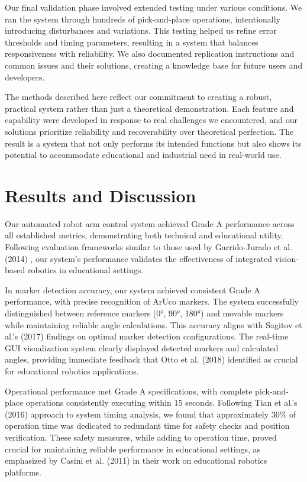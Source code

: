 \documentclass[10pt,twocolumn]{article}
\begin{document}
Our final validation phase involved extended testing under various conditions. We ran the system through hundreds of pick-and-place operations, intentionally introducing disturbances and variations. This testing helped us refine error thresholds and timing parameters, resulting in a system that balances responsiveness with reliability. We also documented replication instructions and common issues and their solutions, creating a knowledge base for future users and developers.

The methods described here reflect our commitment to creating a robust, practical system rather than just a theoretical demonstration. Each feature and capability were developed in response to real challenges we encountered, and our solutions prioritize reliability and recoverability over theoretical perfection. The result is a system that not only performs its intended functions but also shows its potential to accommodate educational and industrial need in real-world use.

\section{Results and Discussion}
Our automated robot arm control system achieved Grade A performance across all established metrics, demonstrating both technical and educational utility. Following evaluation frameworks similar to those used by Garrido-Jurado et al. (2014) \cite{garrido2014automatic}, our system's performance validates the effectiveness of integrated vision-based robotics in educational settings.

In marker detection accuracy, our system achieved consistent Grade A performance, with precise recognition of ArUco markers. The system successfully distinguished between reference markers (0°, 90°, 180°) and movable markers while maintaining reliable angle calculations. This accuracy aligns with Sagitov et al.'s (2017) \cite{sagitov2017comparing} findings on optimal marker detection configurations. The real-time GUI visualization system clearly displayed detected markers and calculated angles, providing immediate feedback that Otto et al. (2018) \cite{otto2018teaching} identified as crucial for educational robotics applications.

Operational performance met Grade A specifications, with complete pick-and-place operations consistently executing within 15 seconds. Following Tian et al.'s (2016) \cite{tian2016development} approach to system timing analysis, we found that approximately 30\% of operation time was dedicated to redundant time for safety checks and position verification. These safety measures, while adding to operation time, proved crucial for maintaining reliable performance in educational settings, as emphasized by Casini et al. (2011) \cite{casini2011lego} in their work on educational robotics platforms.
\end{document}
